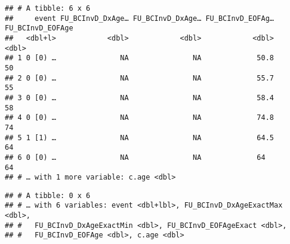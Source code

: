 \documentclass[
]{article}
\newenvironment{Shaded}{\begin{snugshade}}{\end{snugshade}}
\newcommand{\KeywordTok}[1]{\textcolor[rgb]{0.13,0.29,0.53}{\textbf{#1}}}
\newcommand{\NormalTok}[1]{#1}
\newcommand{\OperatorTok}[1]{\textcolor[rgb]{0.81,0.36,0.00}{\textbf{#1}}}
\newcommand{\StringTok}[1]{\textcolor[rgb]{0.31,0.60,0.02}{#1}}
\begin{document}
\begin{Shaded}
\end{Shaded}

\begin{verbatim}
## # A tibble: 6 x 6
##     event FU_BCInvD_DxAge… FU_BCInvD_DxAge… FU_BCInvD_EOFAg… FU_BCInvD_EOFAge
##   <dbl+l>            <dbl>            <dbl>            <dbl>            <dbl>
## 1 0 [0) …               NA               NA             50.8               50
## 2 0 [0) …               NA               NA             55.7               55
## 3 0 [0) …               NA               NA             58.4               58
## 4 0 [0) …               NA               NA             74.8               74
## 5 1 [1) …               NA               NA             64.5               64
## 6 0 [0) …               NA               NA             64                 64
## # … with 1 more variable: c.age <dbl>
\end{verbatim}

\begin{Shaded}
\end{Shaded}

\begin{verbatim}
## # A tibble: 0 x 6
## # … with 6 variables: event <dbl+lbl>, FU_BCInvD_DxAgeExactMax <dbl>,
## #   FU_BCInvD_DxAgeExactMin <dbl>, FU_BCInvD_EOFAgeExact <dbl>,
## #   FU_BCInvD_EOFAge <dbl>, c.age <dbl>
\end{verbatim}
\end{document}
